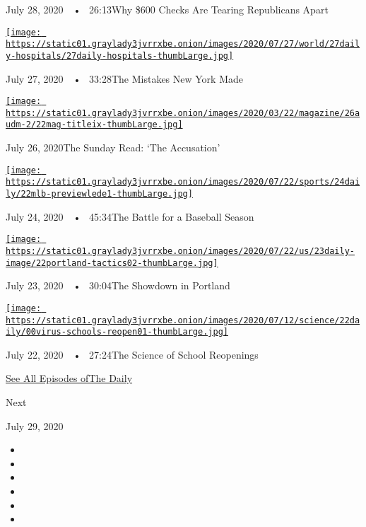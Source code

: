 July 28, 2020~~•~ 26:13Why \$600 Checks Are Tearing Republicans Apart

\href{https://www.nytimes3xbfgragh.onion/2020/07/27/podcasts/the-daily/new-york-hospitals-covid.html?action=click\&module=audio-series-bar\&region=header\&pgtype=Article}{\texttt{[image: https://static01.graylady3jvrrxbe.onion/images/2020/07/27/world/27daily-hospitals/27daily-hospitals-thumbLarge.jpg]}}

July 27, 2020~~•~ 33:28The Mistakes New York Made

\href{https://www.nytimes3xbfgragh.onion/2020/07/26/podcasts/the-daily/the-accusation-the-sunday-read.html?action=click\&module=audio-series-bar\&region=header\&pgtype=Article}{\texttt{[image: https://static01.graylady3jvrrxbe.onion/images/2020/03/22/magazine/26audm-2/22mag-titleix-thumbLarge.jpg]}}

July 26, 2020The Sunday Read: `The Accusation'

\href{https://www.nytimes3xbfgragh.onion/2020/07/24/podcasts/the-daily/mlb-baseball-season-coronavirus.html?action=click\&module=audio-series-bar\&region=header\&pgtype=Article}{\texttt{[image: https://static01.graylady3jvrrxbe.onion/images/2020/07/22/sports/24daily/22mlb-previewlede1-thumbLarge.jpg]}}

July 24, 2020~~•~ 45:34The Battle for a Baseball Season

\href{https://www.nytimes3xbfgragh.onion/2020/07/23/podcasts/the-daily/portland-protests.html?action=click\&module=audio-series-bar\&region=header\&pgtype=Article}{\texttt{[image: https://static01.graylady3jvrrxbe.onion/images/2020/07/22/us/23daily-image/22portland-tactics02-thumbLarge.jpg]}}

July 23, 2020~~•~ 30:04The Showdown in Portland

\href{https://www.nytimes3xbfgragh.onion/2020/07/22/podcasts/the-daily/school-reopenings-coronavirus.html?action=click\&module=audio-series-bar\&region=header\&pgtype=Article}{\texttt{[image: https://static01.graylady3jvrrxbe.onion/images/2020/07/12/science/22daily/00virus-schools-reopen01-thumbLarge.jpg]}}

July 22, 2020~~•~ 27:24The Science of School Reopenings

\href{https://www.nytimes3xbfgragh.onion/column/the-daily}{See All
Episodes ofThe Daily}

Next

July 29, 2020

\begin{itemize}
\item
\item
\item
\item
\item
\item
\end{itemize}

